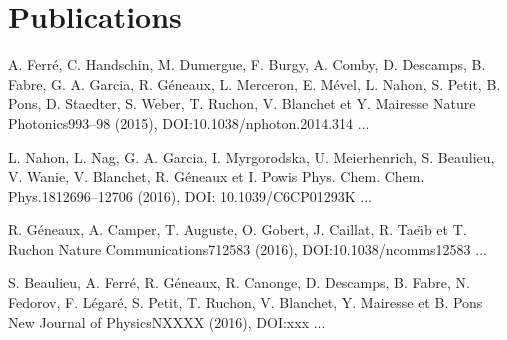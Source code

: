 \part*{Publications}




{A. Ferré, C. Handschin, M. Dumergue, F. Burgy, A. Comby, D. Descamps, B. Fabre, G. A. Garcia, R. Géneaux, L. Merceron, E. Mével, L. Nahon, S. Petit, B. Pons, D. Staedter, S. Weber, T. Ruchon, V. Blanchet et Y. Mairesse} 
{Nature Photonics}{9}{93–98 (2015), DOI:10.1038/nphoton.2014.314}
{...}
\par\noindent

{L. Nahon, L. Nag, G. A. Garcia, I. Myrgorodska, U. Meierhenrich, S. Beaulieu, V. Wanie, V. Blanchet, R. Géneaux et I. Powis} 
{Phys. Chem. Chem. Phys.}{18}{12696–12706 (2016), DOI: 10.1039/C6CP01293K}
{...}
\par\noindent

{R. G\'eneaux, A. Camper, T. Auguste, O. Gobert, J. Caillat, R. Tae{\"\i}b et T. Ruchon} 
{Nature Communications}{7}{12583 (2016), DOI:10.1038/ncomms12583}
{...}
\par\noindent

{S. Beaulieu, A. Ferré, R. Géneaux, R. Canonge, D. Descamps, B. Fabre, N. Fedorov, F. Légaré, S. Petit, T. Ruchon, V. Blanchet, Y. Mairesse et B. Pons} 
{New Journal of Physics}{N}{XXXX (2016), DOI:xxx}
{...}
\par\noindent